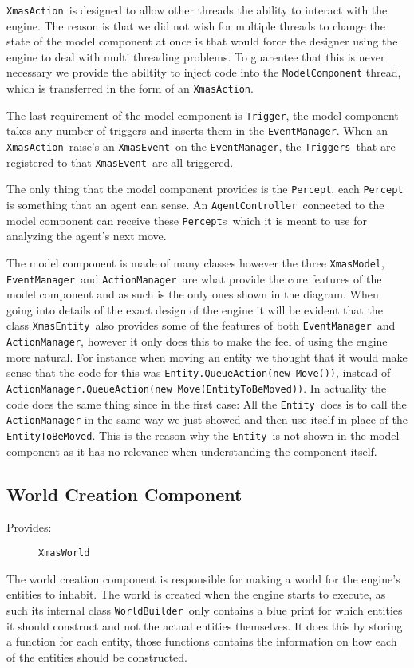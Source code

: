 \texttt{XmasAction }is designed to allow other threads the ability
to interact with the engine. The reason is that we did not wish for
multiple threads to change the state of the model component at once
is that would force the designer using the engine to deal with multi
threading problems. To guarentee that this is never necessary we provide
the abiltity to inject code into the \texttt{ModelComponent} thread,
which is transferred in the form of an \texttt{XmasAction}.

The last requirement of the model component is \texttt{Trigger}, the
model component takes any number of triggers and inserts them in the
\texttt{EventManager}. When an \texttt{XmasAction }raise\textquoteright{}s
an \texttt{XmasEvent }on the \texttt{EventManager}, the \texttt{Triggers
}that are registered to that \texttt{XmasEvent }are all triggered. 

The only thing that the model component provides is the \texttt{Percept},
each \texttt{Percept }is something that an agent can sense. An \texttt{AgentController
}connected to the model component can receive these \texttt{Percept}s\texttt{
}which it is meant to use for analyzing the agent\textquoteright{}s
next move.

The model component is made of many classes however the three \texttt{XmasModel},
\texttt{EventManager }and \texttt{ActionManager }are what provide
the core features of the model component and as such is the only ones
shown in the diagram. When going into details of the exact design
of the engine it will be evident that the class \texttt{XmasEntity
}also provides some of the features of both \texttt{EventManager }and
\texttt{ActionManager}, however it only does this to make the feel
of using the engine more natural. For instance when moving an entity
we thought that it would make sense that the code for this was \texttt{Entity.QueueAction(new
Move())}, instead of \texttt{ActionManager.QueueAction(new Move(EntityToBeMoved))}.
In actuality the code does the same thing since in the first case:
All the \texttt{Entity }does is to call the \texttt{ActionManager}
in the same way we just showed and then use itself in place of the
\texttt{EntityToBeMoved}. This is the reason why the \texttt{Entity
}is not shown in the model component as it has no relevance when understanding
the component itself.


\subsection{World Creation Component}
\begin{description}
\item [{Provides:}] \texttt{XmasWorld}
\end{description}
The world creation component is responsible for making a world for
the engine\textquoteright{}s entities to inhabit. The world is created
when the engine starts to execute, as such its internal class \texttt{WorldBuilder
}only contains a blue print for which entities it should construct
and not the actual entities themselves. It does this by storing a
function for each entity, those functions contains the information
on how each of the entities should be constructed.

